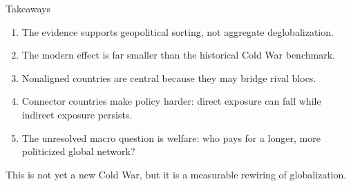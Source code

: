 \documentclass[11pt]{beamer}
\begin{document}
\begin{frame}{Takeaways}
  \begin{enumerate}
    \item The evidence supports geopolitical sorting, not aggregate deglobalization.
    \item The modern effect is far smaller than the historical Cold War benchmark.
    \item Nonaligned countries are central because they may bridge rival blocs.
    \item Connector countries make policy harder: direct exposure can fall while indirect exposure persists.
    \item The unresolved macro question is welfare: who pays for a longer, more politicized global network?
  \end{enumerate}
  This is not yet a new Cold War, but it is a measurable rewiring of globalization.
\end{frame}
\end{document}
